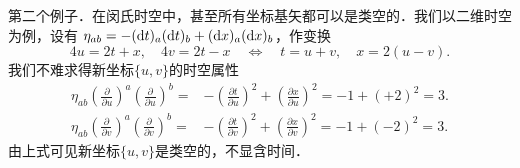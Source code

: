 第二个例子．在闵氏时空中，甚至所有坐标基矢都可以是类空的．我们以二维时空为例，设有
$\eta_{ab} = -({\rm d}t)_a ({\rm d}t)_b+({\rm d}x)_a({\rm d}x)_b$，作变换
\begin{equation*}
	4u= 2t + x, \quad 4v= 2t-x
	\quad \Leftrightarrow \quad
	t= u+v,\quad x= 2(u-v).
\end{equation*}
我们不难求得新坐标$\{u,v\}$的时空属性
\begin{align*}
	\eta_{ab} \left(\frac{\partial}{\partial u}\right)^a \left(\frac{\partial}{\partial u}\right)^b 
	=& -\left(\frac{\partial t}{\partial u}\right)^2 +	\left( \frac{\partial x}{\partial u}\right)^2
	= -1 + (+2)^2 =3. \\
	\eta_{ab} \left(\frac{\partial}{\partial v}\right)^a \left(\frac{\partial}{\partial v}\right)^b 
	=& -\left(\frac{\partial t}{\partial v}\right)^2 +	\left( \frac{\partial x}{\partial v}\right)^2
	= -1 + (-2)^2 =3. 
\end{align*}
由上式可见新坐标$\{u,v\}$是类空的，不显含时间．


